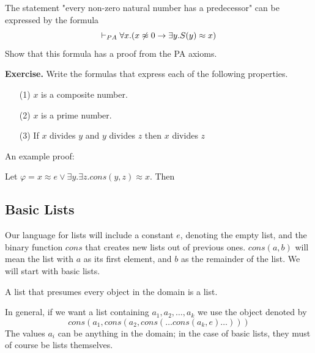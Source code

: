 \documentclass[english, 11pt]{article}
\begin{document}
    \begin{exmp}
      The statement "every non-zero natural number has a predecessor" can be expressed by the formula
      \[ \vdash_{PA} \forall x. (x \not \approx 0 \rightarrow \exists y .S(y) \approx x) \]
      Show that this formula has a proof from the PA axioms.
    \end{exmp}

    \textbf{Exercise.} Write the formulas that express each of the following properties.
    \begin{itemize}
      \item[(1)] $x$ is a composite number.
      \item[(2)] $x$ is a prime number.
      \item[(3)] If $x$ divides $y$ and $y$ divides $z$ then $x$ divides $z$
    \end{itemize}

    An example proof:

       Let $\varphi = x \approx e \lor \exists y. \exists z. cons(y,z) \approx x$. Then
    \begin{flagderiv}
    \end{flagderiv}

    \subsection{Basic Lists}

    Our language for lists will include a constant $e$, denoting the empty list, and the binary function $cons$ that creates new lists out of previous ones. $cons(a,b)$ will mean the list with $a$ as its first element, and $b$ as the remainder of the list. We will start with basic lists.

    \begin{defn}\label{basic list}
    A list that presumes every object in the domain is a list.
    \end{defn}

    In general, if we want a list containing $a_1, a_2, \ldots, a_k$ we use the object denoted by
    \[ cons(a_1, cons(a_2, cons(\ldots cons(a_k,e)\ldots))) \]
    The values $a_i$ can be anything in the domain; in the case of basic lists, they must of course be lists themselves.
\end{document}
